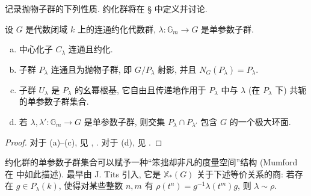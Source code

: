 记录抛物子群的下列性质. 约化群将在 \S{} 中定义并讨论.
\begin{proposition}\label{src:B.1.29}
设 $G$ 是代数闭域 $k$ 上的连通约化代数群, $\lambda:\mathbb G_m\to G$ 是单参数子群.
\begin{enumerate}[(a)]
\item 中心化子 $C_\lambda$ 连通且约化.
\item 子群 $P_\lambda$ 连通且为抛物子群, 即 $G/P_\lambda$ 射影, 并且 $N_G(P_\lambda)=P_\lambda$.
\item 子群 $U_\lambda$ 是 $P_\lambda$ 的幺幂根基, 它自由且传递地作用于 $P_\lambda$ 中与 $\lambda$ (在 $P_\lambda$ 下) 共轭的单参数子群集合.
\item 若 $\lambda,\lambda':\mathbb G_m\to G$ 是单参数子群, 则交集 $P_\lambda\cap P_{\lambda'}$ 包含 $G$ 的一个极大环面.
\end{enumerate}
\end{proposition}
\begin{proof}
对于 (a)--(c), 见 \cite[\S$13.4$]{Spr98}, \cite[定理 $4.1.7$ 及推论 $5.2.8$]{Con14}. 对于 (d), 见 \cite[命题 $20.7$]{Bor91}.
\end{proof}
\begin{remark}[球面建筑]\label{src:B.1.30}
约化群的单参数子群集合可以赋予一种``笨拙却非凡的度量空间''结构 (Mumford 在 \cite[第 $55$ 页]{GIT} 中如此描述).  最早由 J. Tits 引入, 它是 $\mathbb X_*(G)$ 关于下述等价关系的商: 若存在 $g\in P_\lambda(k)$, 使得对某些整数 $n,m$ 有 $\rho(t^n)=g^{-1}\lambda(t^m)g$, 则 $\lambda\sim\rho$.
\end{remark}

